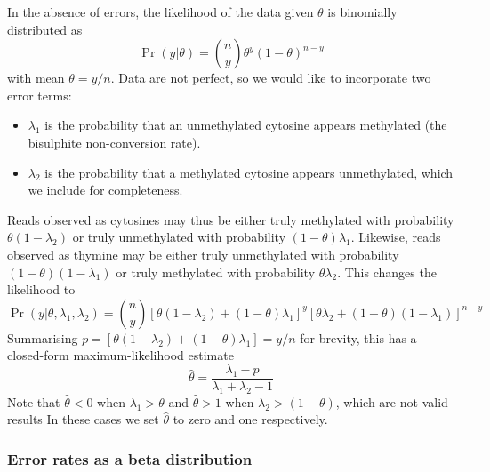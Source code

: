 \documentclass[12pt,longbibliography]{article}
\begin{document}
In the absence of errors, the likelihood of the data given $\theta$ is binomially distributed as
\begin{equation}
    \label{eqn:classic-binomial}
    \Pr(y| \theta) = {n \choose y} \theta^y(1-\theta)^{n-y}
\end{equation}
with mean $\theta=y/n$.
Data are not perfect, so we would like to incorporate two error terms:
\begin{itemize}
    \item $\lambda_1$ is the probability that an unmethylated cytosine appears methylated (the bisulphite non-conversion rate).
    \item $\lambda_2$ is the probability that a methylated cytosine appears unmethylated, which we include for completeness.
\end{itemize}
Reads observed as cytosines may thus be either truly methylated with probability $\theta(1-\lambda_2)$ or truly unmethylated with probability $(1-\theta)\lambda_1$. Likewise, reads observed as thymine may be either truly unmethylated with probability $(1-\theta)(1-\lambda_1)$ or truly methylated with probability $\theta \lambda_2$.
This changes the likelihood to
\begin{equation}
    \label{eqn:binom-with-errors}
    \Pr(y | \theta, \lambda_1, \lambda_2) = 
    {n \choose y}
    [\theta(1-\lambda_2) + (1-\theta)\lambda_1]^y
    [\theta \lambda_2 + (1-\theta)(1-\lambda_1)]^{n-y}
\end{equation}
Summarising $p=[\theta(1-\lambda_2) + (1-\theta)\lambda_1] = y/n$ for brevity, this has a closed-form maximum-likelihood estimate
\begin{equation}
    \label{eqn:ml-theta}
    \hat{\theta} = \frac{\lambda_1-p}{\lambda_1 + \lambda_2 -1}
\end{equation}
Note that $\hat{\theta}<0$ when $\lambda_1 > \theta$ and $\hat{\theta}>1$ when $\lambda_2 > (1-\theta)$, which are not valid results
In these cases we set $\hat{\theta}$ to zero and one respectively.

\subsubsection{Error rates as a beta distribution} \label{sec:mean-as-beta}
\end{document}
